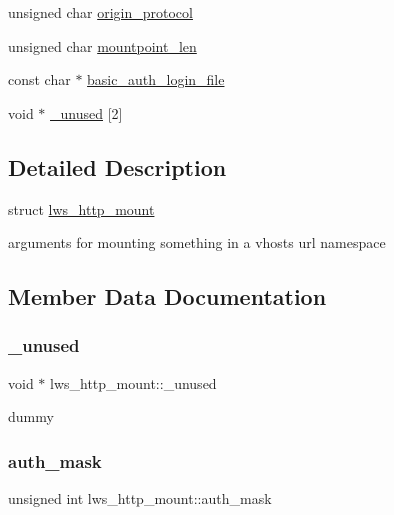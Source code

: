 \begin{DoxyCompactItemize}
\item 
unsigned char \hyperlink{structlws__http__mount_a6a9b1492a0b9749e39bd19932717a0b7}{origin\+\_\+protocol}
\item 
unsigned char \hyperlink{structlws__http__mount_ac8489b60b8f969eb19c9abbdeac90743}{mountpoint\+\_\+len}
\item 
const char $\ast$ \hyperlink{structlws__http__mount_ae7abd0042521f2c62c8caf875ceddb37}{basic\+\_\+auth\+\_\+login\+\_\+file}
\item 
void $\ast$ \hyperlink{structlws__http__mount_a257fe3e8cea0b544048753249da68e0e}{\+\_\+unused} \mbox{[}2\mbox{]}
\end{DoxyCompactItemize}


\subsection{Detailed Description}
struct \hyperlink{structlws__http__mount}{lws\+\_\+http\+\_\+mount}

arguments for mounting something in a vhost\textquotesingle{}s url namespace 

\subsection{Member Data Documentation}
\mbox{\label{structlws__http__mount_a257fe3e8cea0b544048753249da68e0e}} 
\subsubsection{\texorpdfstring{\+\_\+unused}{\_unused}}
{\footnotesize\ttfamily void $\ast$ lws\+\_\+http\+\_\+mount\+::\+\_\+unused}

dummy \mbox{\label{structlws__http__mount_a614364c770b0bd4db464ad65cddab477}} 
\subsubsection{\texorpdfstring{auth\+\_\+mask}{auth\_mask}}
{\footnotesize\ttfamily unsigned int lws\+\_\+http\+\_\+mount\+::auth\+\_\+mask}

